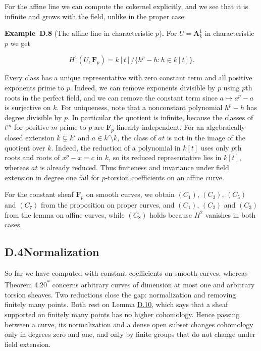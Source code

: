 \documentclass[11pt]{article}
\newenvironment{bpstatement}[2]{\par\addvspace{0.6\baselineskip}\noindent\textbf{#1}#2\textbf{.}\enspace\ignorespaces}
  {\par\addvspace{0.4\baselineskip}}
\newcommand{\bpout}[1]{#1\textsuperscript{\hyperlink{bp-outside}{\ensuremath{\ast}}}}
\begin{document}
\label{bp196}%
For the affine line we can compute the cokernel explicitly, and we see that it is infinite and grows with the field, unlike in the proper case.

\label{bp197}%
\begin{bpstatement}{Example~D.8}{ (The affine line in characteristic $p$)}
For \(U=\mathbf A^1_k\) in characteristic \(p\) we get

\[
H^1(U,\mathbf F_p)=k[t]/\{h^p-h:h\in k[t]\}.
\]

Every class has a unique representative with zero constant term and all positive exponents prime to \(p\).  Indeed, we can remove exponents divisible by \(p\) using \(p\)th roots in the perfect field, and we can remove the constant term since \(a\mapsto a^p-a\) is surjective on \(k\). For uniqueness, note that a nonconstant polynomial \(h^p-h\) has degree divisible by \(p\).  In particular the quotient is infinite, because the classes of \(t^m\) for positive \(m\) prime to \(p\) are \(\mathbf F_p\)-linearly independent.  For an algebraically closed extension \(k\subsetneq k'\) and \(a\in k'\setminus k\), the class of \(at\) is not in the image of the quotient over \(k\). Indeed, the reduction of a polynomial in \(k[t]\) uses only \(p\)th roots and roots of \(x^p-x=c\) in \(k\), so its reduced representative lies in \(k[t]\), whereas \(at\) is already reduced. Thus finiteness and invariance under field extension in degree one fail for \(p\)-torsion coefficients on an affine curve.
\end{bpstatement}

\label{bp198}%
For the constant sheaf \(\mathbf F_p\) on smooth curves, we obtain \((C_1)\), \((C_3)\), \((C_5)\) and \((C_7)\) from the proposition on proper curves, and \((C_1)\), \((C_2)\) and \((C_3)\) from the lemma on affine curves, while \((C_8)\) holds because \(H^2\) vanishes in both cases.


\subsection*{\texorpdfstring{D.4\quad Normalization}{D.4 Normalization}}
\label{bp199}%
\label{bp200}%
So far we have computed with constant coefficients on smooth curves, whereas Theorem \bpout{4.20} concerns arbitrary curves of dimension at most one and arbitrary torsion sheaves. Two reductions close the gap: normalization and removing finitely many points. Both rest on Lemma \hyperref[bp204]{D.10}, which says that a sheaf supported on finitely many points has no higher cohomology. Hence passing between a curve, its normalization and a dense open subset changes cohomology only in degrees zero and one, and only by finite groups that do not change under field extension.
\end{document}
